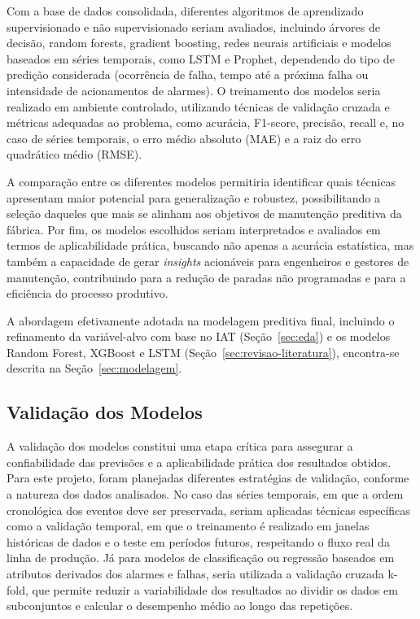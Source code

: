 Com a base de dados consolidada, diferentes algoritmos de aprendizado supervisionado e não supervisionado seriam avaliados, incluindo árvores de decisão, random forests, gradient boosting, redes neurais artificiais e modelos baseados em séries temporais, como LSTM e Prophet, dependendo do tipo de predição considerada (ocorrência de falha, tempo até a próxima falha ou intensidade de acionamentos de alarmes). O treinamento dos modelos seria realizado em ambiente controlado, utilizando técnicas de validação cruzada e métricas adequadas ao problema, como acurácia, F1-score, precisão, recall e, no caso de séries temporais, o erro médio absoluto (MAE) e a raiz do erro quadrático médio (RMSE).

A comparação entre os diferentes modelos permitiria identificar quais técnicas apresentam maior potencial para generalização e robustez, possibilitando a seleção daqueles que mais se alinham aos objetivos de manutenção preditiva da fábrica. Por fim, os modelos escolhidos seriam interpretados e avaliados em termos de aplicabilidade prática, buscando não apenas a acurácia estatística, mas também a capacidade de gerar \textit{insights} acionáveis para engenheiros e gestores de manutenção, contribuindo para a redução de paradas não programadas e para a eficiência do processo produtivo.

A abordagem efetivamente adotada na modelagem preditiva final, incluindo o refinamento da variável-alvo com base no IAT (Seção~\ref{sec:eda}) e os modelos Random Forest, XGBoost e LSTM (Seção~\ref{sec:revisao-literatura}), encontra-se descrita na Seção~\ref{sec:modelagem}.

\subsection{Validação dos Modelos}
\label{sec:apendice-validacao}

A validação dos modelos constitui uma etapa crítica para assegurar a confiabilidade das previsões e a aplicabilidade prática dos resultados obtidos. Para este projeto, foram planejadas diferentes estratégias de validação, conforme a natureza dos dados analisados. No caso das séries temporais, em que a ordem cronológica dos eventos deve ser preservada, seriam aplicadas técnicas específicas como a validação temporal, em que o treinamento é realizado em janelas históricas de dados e o teste em períodos futuros, respeitando o fluxo real da linha de produção. Já para modelos de classificação ou regressão baseados em atributos derivados dos alarmes e falhas, seria utilizada a validação cruzada k-fold, que permite reduzir a variabilidade dos resultados ao dividir os dados em subconjuntos e calcular o desempenho médio ao longo das repetições.

